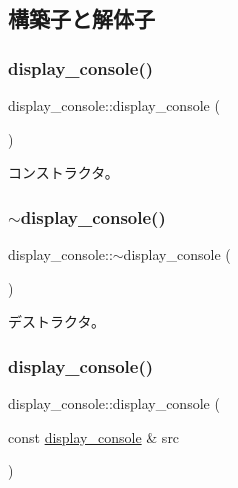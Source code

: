 \subsection{構築子と解体子}
\hypertarget{classdisplay__console_a6448ae90752aa1b07fd8ae741313ab7c}{}\label{classdisplay__console_a6448ae90752aa1b07fd8ae741313ab7c} 
\subsubsection{\texorpdfstring{display\+\_\+console()}{display\_console()}\hspace{0.1cm}{\footnotesize\ttfamily [1/3]}}
{\footnotesize\ttfamily display\+\_\+console\+::display\+\_\+console (\begin{DoxyParamCaption}{ }\end{DoxyParamCaption})}

コンストラクタ。 \hypertarget{classdisplay__console_a3e71de8ef36ebf5a251f27bfa86f90c6}{}\label{classdisplay__console_a3e71de8ef36ebf5a251f27bfa86f90c6} 
\subsubsection{\texorpdfstring{$\sim$display\+\_\+console()}{~display\_console()}}
{\footnotesize\ttfamily display\+\_\+console\+::$\sim$display\+\_\+console (\begin{DoxyParamCaption}{ }\end{DoxyParamCaption})\hspace{0.3cm}{\ttfamily [virtual]}}

デストラクタ。 \hypertarget{classdisplay__console_ab1499fd27e83677c4988265c2f33b011}{}\label{classdisplay__console_ab1499fd27e83677c4988265c2f33b011} 
\subsubsection{\texorpdfstring{display\+\_\+console()}{display\_console()}\hspace{0.1cm}{\footnotesize\ttfamily [2/3]}}
{\footnotesize\ttfamily display\+\_\+console\+::display\+\_\+console (\begin{DoxyParamCaption}\item[{const \hyperlink{classdisplay__console}{display\+\_\+console} \&}]{src }\end{DoxyParamCaption})\hspace{0.3cm}{\ttfamily [delete]}}

